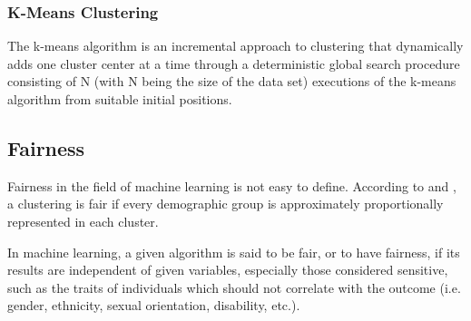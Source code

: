 \subsubsection{K-Means Clustering}

The k-means algorithm is an incremental approach to clustering that dynamically adds one cluster
center at a time through a deterministic global search procedure consisting of N (with N being the size of the data set) executions of the k-means algorithm from suitable initial positions.\autocite[]{Likas2003}



\subsection{Fairness}
Fairness in the field of machine learning is not easy to define. According to \textcite[]{Chierichetti2018} and \textcite[]{Kleindessner2019}, a clustering is fair if every demographic group is approximately proportionally represented in each cluster.

In machine learning, a given algorithm is said to be fair, or to have fairness, if its results are independent of given variables, especially those considered sensitive, such as the traits of individuals which should not correlate with the outcome (i.e. gender, ethnicity, sexual orientation, disability, etc.).
